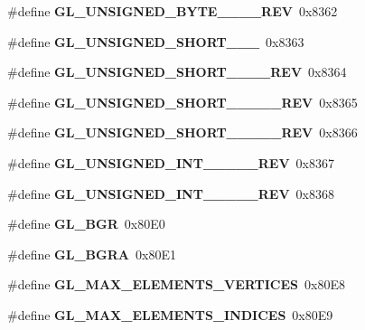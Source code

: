 \begin{DoxyCompactItemize}
\item 
\#define {\bfseries G\+L\+\_\+\+U\+N\+S\+I\+G\+N\+E\+D\+\_\+\+B\+Y\+T\+E\+\_\+\_\+\_\+\_\+\+R\+E\+V}~0x8362\label{_s_d_l__opengl_8h_aebe39160c74c33c76b1e77695a179747}

\item 
\#define {\bfseries G\+L\+\_\+\+U\+N\+S\+I\+G\+N\+E\+D\+\_\+\+S\+H\+O\+R\+T\+\_\+\_\+\_}~0x8363\label{_s_d_l__opengl_8h_aecec622a15619219f88d13271b5fd581}

\item 
\#define {\bfseries G\+L\+\_\+\+U\+N\+S\+I\+G\+N\+E\+D\+\_\+\+S\+H\+O\+R\+T\+\_\+\_\+\_\+\_\+\+R\+E\+V}~0x8364\label{_s_d_l__opengl_8h_a513c57ee211a7cb499956f20e1f0363d}

\item 
\#define {\bfseries G\+L\+\_\+\+U\+N\+S\+I\+G\+N\+E\+D\+\_\+\+S\+H\+O\+R\+T\+\_\+\_\+\_\+\_\+\_\+\+R\+E\+V}~0x8365\label{_s_d_l__opengl_8h_a30dd1a52571e3a1deffa686bf1208c68}

\item 
\#define {\bfseries G\+L\+\_\+\+U\+N\+S\+I\+G\+N\+E\+D\+\_\+\+S\+H\+O\+R\+T\+\_\+\_\+\_\+\_\+\_\+\+R\+E\+V}~0x8366\label{_s_d_l__opengl_8h_ae0f0fe9a3a82b9a25d0d35aa20931097}

\item 
\#define {\bfseries G\+L\+\_\+\+U\+N\+S\+I\+G\+N\+E\+D\+\_\+\+I\+N\+T\+\_\+\_\+\_\+\_\+\_\+\+R\+E\+V}~0x8367\label{_s_d_l__opengl_8h_aeafffc5d69d3f9e05af201e59c0e78d3}

\item 
\#define {\bfseries G\+L\+\_\+\+U\+N\+S\+I\+G\+N\+E\+D\+\_\+\+I\+N\+T\+\_\+\_\+\_\+\_\+\_\+\+R\+E\+V}~0x8368\label{_s_d_l__opengl_8h_aefaf553edc188af69b624b40bbecc380}

\item 
\#define {\bfseries G\+L\+\_\+\+B\+G\+R}~0x80\+E0\label{_s_d_l__opengl_8h_a35d2992fb6ceb223785f916798c69901}

\item 
\#define {\bfseries G\+L\+\_\+\+B\+G\+R\+A}~0x80\+E1\label{_s_d_l__opengl_8h_a56707576fd3e2da55343c25da155294d}

\item 
\#define {\bfseries G\+L\+\_\+\+M\+A\+X\+\_\+\+E\+L\+E\+M\+E\+N\+T\+S\+\_\+\+V\+E\+R\+T\+I\+C\+E\+S}~0x80\+E8\label{_s_d_l__opengl_8h_ab6be24928d250f1a9e4e3d34a3ae9f4a}

\item 
\#define {\bfseries G\+L\+\_\+\+M\+A\+X\+\_\+\+E\+L\+E\+M\+E\+N\+T\+S\+\_\+\+I\+N\+D\+I\+C\+E\+S}~0x80\+E9\label{_s_d_l__opengl_8h_a9dd94df46c02d0d705915fda674ab1f4}


\end{DoxyCompactItemize}
